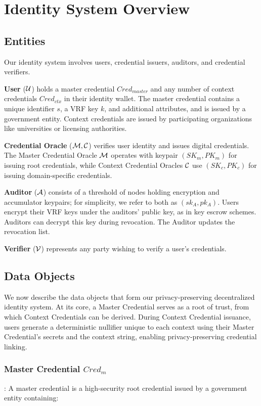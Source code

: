 \cleardoublepage
\section{Identity System Overview}

\subsection{Entities}
Our identity system involves users, credential issuers, auditors, and credential verifiers.

\noindent \textbf{User} ($\mathcal{U}$) holds a master credential $Cred_{master}$ and any number of context credentials $Cred_{ctx}$ in their identity wallet. The master credential contains a unique identifier $s$, a VRF key $k$, and additional attributes, and is issued by a government entity. Context credentials are issued by participating organizations like universities or licensing authorities.

\noindent \textbf{Credential Oracle} ($\mathcal{M}, \mathcal{C}$) verifies user identity and issues digital credentials. The Master Credential Oracle $\mathcal{M}$ operates with keypair $(SK_{m}, PK_{m})$ for issuing root credentials, while Context Credential Oracles $\mathcal{C}$ use $(SK_{c}, PK_{c})$ for issuing domain-specific credentials.

\noindent \textbf{Auditor} ($\mathcal{A}$) consists of a threshold of nodes holding encryption and accumulator keypairs; for simplicity, we refer to both as $(sk_A, pk_A)$. Users encrypt their VRF keys under the auditors' public key, as in key escrow schemes. Auditors can decrypt this key during revocation. The Auditor updates the revocation list. 

\noindent \textbf{Verifier} ($\mathcal{V}$) represents any party wishing to verify a user's credentials.


\subsection{Data Objects}

We now describe the data objects that form our privacy-preserving decentralized identity system. At its core, a Master Credential serves as a root of trust, from which Context Credentials can be derived. During Context Credential issuance, users generate a deterministic nullifier unique to each context using their Master Credential's secrets and the context string, enabling privacy-preserving credential linking.

\subsubsection{Master Credential $Cred_m$}: 
A master credential is a high-security root credential issued by a government entity containing:

